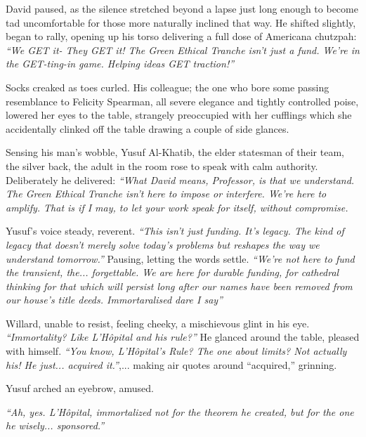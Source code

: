 \smallskip

David paused, as the silence stretched beyond a lapse just long enough to become tad uncomfortable for those more naturally inclined that way. He shifted slightly, began to rally, opening up his torso delivering a full dose of Americana chutzpah: \textit{“We GET it- They GET it! The Green Ethical Tranche isn’t just a fund. We’re in the GET-ting-in game. Helping ideas GET traction!”}

\smallskip

Socks creaked as toes curled. His colleague; the one who bore some passing resemblance to Felicity Spearman, all severe elegance and tightly controlled poise, lowered her eyes to the table, strangely preoccupied with her cufflings which she accidentally clinked off the table drawing a couple of side glances.

\smallskip

Sensing his man's wobble, Yusuf Al-Khatib, the elder statesman of their team,  the silver back, the adult in the room rose to speak with calm authority. Deliberately he delivered: \textit{“What David means, Professor, is that we understand. The Green Ethical Tranche isn’t here to impose or interfere. We’re here to amplify. That is if I may, to let your work speak for itself, without compromise. }

\smallskip

Yusuf’s voice steady, reverent. \textit{“This isn’t just funding. It’s legacy. The kind of legacy that doesn’t merely solve today’s problems but reshapes the way we understand tomorrow.”} Pausing, letting the words settle. \textit{“We’re not here to fund the transient, the... forgettable. We are here for durable funding, for cathedral thinking for that which will persist long after our names have been removed from our house's title deeds. Immortaralised dare I say”}

\smallskip

Willard, unable to resist, feeling cheeky, a mischievous glint in his eye. \textit{“Immortality? Like L’Hôpital and his rule?”} He glanced around the table, pleased with himself. \textit{“You know, L’Hôpital’s Rule? The one about limits? Not actually his! He just... acquired it.”},... making air quotes around “acquired,” grinning.
\smallskip 

Yusuf arched an eyebrow, amused.

\textit{“Ah, yes. L’Hôpital, immortalized not for the theorem he created, but for the one he wisely... sponsored.”}
\smallskip 

